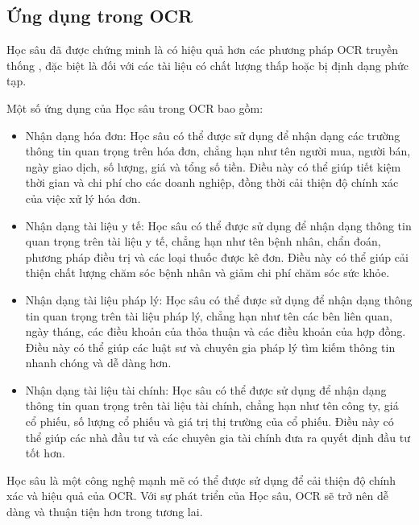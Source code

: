 \subsection{Ứng dụng trong OCR}
Học sâu đã được chứng minh là có hiệu quả hơn các phương pháp OCR truyền thống \cite{ai-vs-traditional}, đặc biệt là đối với các tài liệu có chất lượng thấp hoặc bị định dạng phức tạp.

Một số ứng dụng của Học sâu trong OCR bao gồm:
\begin{itemize}
    \item Nhận dạng hóa đơn: Học sâu có thể được sử dụng để nhận dạng các trường thông tin quan trọng trên hóa đơn, chẳng hạn như tên người mua, người bán, ngày giao dịch, số lượng, giá và tổng số tiền. Điều này có thể giúp tiết kiệm thời gian và chi phí cho các doanh nghiệp, đồng thời cải thiện độ chính xác của việc xử lý hóa đơn.
    \item Nhận dạng tài liệu y tế: Học sâu có thể được sử dụng để nhận dạng thông tin quan trọng trên tài liệu y tế, chẳng hạn như tên bệnh nhân, chẩn đoán, phương pháp điều trị và các loại thuốc được kê đơn. Điều này có thể giúp cải thiện chất lượng chăm sóc bệnh nhân và giảm chi phí chăm sóc sức khỏe.
    \item Nhận dạng tài liệu pháp lý: Học sâu có thể được sử dụng để nhận dạng thông tin quan trọng trên tài liệu pháp lý, chẳng hạn như tên các bên liên quan, ngày tháng, các điều khoản của thỏa thuận và các điều khoản của hợp đồng. Điều này có thể giúp các luật sư và chuyên gia pháp lý tìm kiếm thông tin nhanh chóng và dễ dàng hơn.
    \item Nhận dạng tài liệu tài chính: Học sâu có thể được sử dụng để nhận dạng thông tin quan trọng trên tài liệu tài chính, chẳng hạn như tên công ty, giá cổ phiếu, số lượng cổ phiếu và giá trị thị trường của cổ phiếu. Điều này có thể giúp các nhà đầu tư và các chuyên gia tài chính đưa ra quyết định đầu tư tốt hơn.
\end{itemize}
Học sâu là một công nghệ mạnh mẽ có thể được sử dụng để cải thiện độ chính xác và hiệu quả của OCR. Với sự phát triển của Học sâu, OCR sẽ trở nên dễ dàng và thuận tiện hơn trong tương lai.

